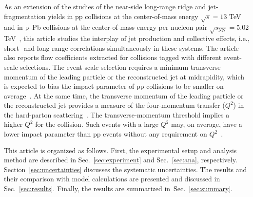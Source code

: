 As an extension of the studies of the near-side long-range ridge and jet-fragmentation yields in pp collisions at the center-of-mass energy $\sqrt{s}=13$ TeV~\cite{ALICE:2021nir} and in p--Pb collisions at the center-of-mass energy per nucleon pair $\sqrt{s_{\mathrm{NN}}}=5.02$ TeV~\cite{ALICE:2012eyl,ALICE:2013snk}, this article studies the interplay of jet production and collective effects, i.e., short- and long-range correlations simultaneously in these systems. The article also reports flow coefficients extracted for collisions tagged with different event-scale selections. The event-scale selection requires a minimum transverse momentum of the leading particle or the reconstructed jet at midrapidity, which is expected to bias the impact parameter of pp collisions to be smaller on average~\cite{Sjostrand:1986ep,Frankfurt:2003td,Frankfurt:2010ea}. At the same time, the transverse momentum of the leading particle or the reconstructed jet provides a measure of the four-momentum transfer ($Q^2$) in the hard-parton scattering~\cite{Chatrchyan:2012tt, Chatrchyan:2011id,ALICE:2022fnb}. The transverse-momentum threshold implies a higher $Q^2$ for the collision. Such events with a large $Q^2$ may, on average, have a lower impact parameter than pp events without any requirement on $Q^2$~\cite{Frankfurt:2003td}.

This article is organized as follows. First, the experimental setup and analysis method are described in Sec.~\ref{sec:experiment} and Sec.~\ref{sec:ana}, respectively. Section~\ref{sec:uncertainties} discusses the systematic uncertainties. The results and their comparison with model calculations are presented and discussed in Sec.~\ref{sec:results}. Finally, the results are summarized in~Sec.~\ref{sec:summary}.

 
